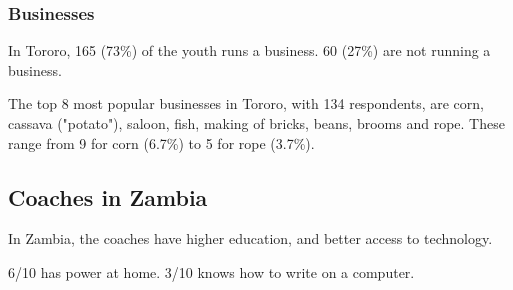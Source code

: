 \subsubsection{Businesses}
In Tororo, 165 (73\%) of the youth runs a business. 60 (27\%) are not running a business.

The top 8 most popular businesses in Tororo, with 134 respondents, are corn, cassava ("potato"), saloon, fish, making of bricks, beans, brooms and rope. These range from 9 for corn (6.7\%) to 5 for rope (3.7\%).

\subsection{Coaches in Zambia}

In Zambia, the coaches have higher education, and better access to technology.

6/10 has power at home.
3/10 knows how to write on a computer.

